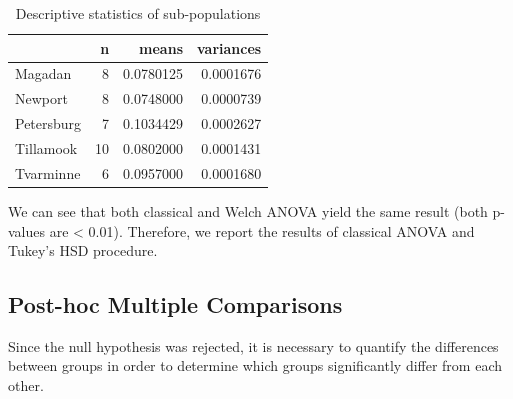 \documentclass[
]{book}
\newenvironment{Shaded}{\begin{snugshade}}{\end{snugshade}}
\newcommand{\AttributeTok}[1]{\textcolor[rgb]{0.13,0.29,0.53}{#1}}
\newcommand{\CommentTok}[1]{\textcolor[rgb]{0.56,0.35,0.01}{\textit{#1}}}
\newcommand{\DecValTok}[1]{\textcolor[rgb]{0.00,0.00,0.81}{#1}}
\newcommand{\FunctionTok}[1]{\textcolor[rgb]{0.13,0.29,0.53}{\textbf{#1}}}
\newcommand{\NormalTok}[1]{#1}
\newcommand{\OtherTok}[1]{\textcolor[rgb]{0.56,0.35,0.01}{#1}}
\newcommand{\SpecialCharTok}[1]{\textcolor[rgb]{0.81,0.36,0.00}{\textbf{#1}}}
\newcommand{\StringTok}[1]{\textcolor[rgb]{0.31,0.60,0.02}{#1}}
\begin{document}
\begin{Shaded}
\end{Shaded}

\begin{table}

\caption{\label{tab:unnamed-chunk-130}Descriptive statistics of sub-populations}
\centering
\begin{tabular}[t]{l|r|r|r}
\hline
  & n & means & variances\\
\hline
Magadan & 8 & 0.0780125 & 0.0001676\\
\hline
Newport & 8 & 0.0748000 & 0.0000739\\
\hline
Petersburg & 7 & 0.1034429 & 0.0002627\\
\hline
Tillamook & 10 & 0.0802000 & 0.0001431\\
\hline
Tvarminne & 6 & 0.0957000 & 0.0001680\\
\hline
\end{tabular}
\end{table}

We can see that both classical and Welch ANOVA yield the same result (both p-values are \textless{} 0.01). Therefore, we report the results of classical ANOVA and Tukey's HSD procedure.

\hypertarget{post-hoc-multiple-comparisons}{%
\subsection{Post-hoc Multiple Comparisons}\label{post-hoc-multiple-comparisons}}

Since the null hypothesis was rejected, it is necessary to quantify the differences between groups in order to determine which groups significantly differ from each other.
\end{document}
